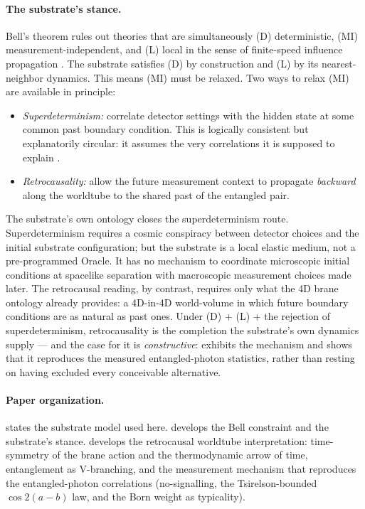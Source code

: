 \paragraph{The substrate's stance.}
Bell's theorem rules out theories that are simultaneously (D) deterministic, (MI)
measurement-independent, and (L) local in the sense of finite-speed influence propagation
\citep{Bell1964,CHSH1969}.
The substrate satisfies (D) by construction and (L) by its nearest-neighbor dynamics.
This means (MI) must be relaxed.
Two ways to relax (MI) are available in principle:
\begin{itemize}
  \item \emph{Superdeterminism:} correlate detector settings with the hidden state at some
  common past boundary condition.
  This is logically consistent but explanatorily circular: it assumes the very correlations it
  is supposed to explain \citep{Hossenfelder2020Superdeterminism}.
  \item \emph{Retrocausality:} allow the future measurement context to propagate \emph{backward}
  along the worldtube to the shared past of the entangled pair.
\end{itemize}
The substrate's own ontology closes the superdeterminism route.
Superdeterminism requires a cosmic conspiracy between detector choices and the initial substrate
configuration; but the substrate is a local elastic medium, not a pre-programmed Oracle.
It has no mechanism to coordinate microscopic initial conditions at spacelike separation with
macroscopic measurement choices made later.
The retrocausal reading, by contrast, requires only what the 4D brane ontology already provides:
a 4D-in-4D world-volume in which future boundary conditions are as natural as past ones.
Under (D) + (L) + the rejection of superdeterminism, retrocausality is the completion the
substrate's own dynamics supply --- and the case for it is \emph{constructive}: 
exhibits the mechanism and shows that it reproduces the measured entangled-photon statistics,
rather than resting on having excluded every conceivable alternative.

\paragraph{Paper organization.}
 states the substrate model used here.
 develops the Bell constraint and the substrate's stance.
 develops the retrocausal worldtube interpretation: time-symmetry of the brane
action and the thermodynamic arrow of time, entanglement as V-branching, and the measurement
mechanism that reproduces the entangled-photon correlations (no-signalling, the Tsirelson-bounded
$\cos 2(a-b)$ law, and the Born weight as typicality).